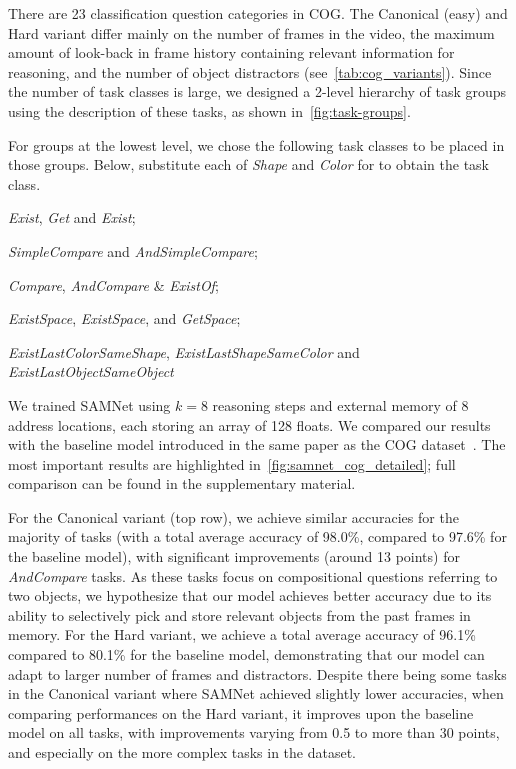 There are 23 classification question categories in COG. The Canonical (easy) and Hard variant differ mainly on the number of frames in the video, the maximum amount of look-back in frame history containing relevant information for reasoning, and the number of object distractors (see~\cref{tab:cog_variants}). Since the number of task classes is large, we designed a 2-level hierarchy of task groups using the
description of these tasks, as shown in~\cref{fig:task-groups}.

For groups at the lowest level, we chose the following task classes to be placed in those groups.
Below, substitute each of \textit{Shape} and \textit{Color} for  \uX{} to obtain the task class.
\begin{description}
	\compresslist
	\item[Basic:] \textit{Exist}\uX, \textit{Get}\uX{} and \textit{Exist};
	\item[Obj-Attr:] \emph{SimpleCompare}\uX{} and \textit{AndSimpleCompare}\uX;
	\item[Compare:] \textit{Compare}\uX,  \textit{AndCompare}\uX{} \& \textit{Exist}\uX\textit{Of};
	\item[Spatial:] \textit{ExistSpace}, \textit{Exist}\uX\textit{Space}, and \textit{Get}\uX\textit{Space};
	\item[Cognitive:] \textit{ExistLastColorSameShape}, \textit{ExistLastShapeSameColor} and \textit{ExistLastObjectSameObject}
\end{description}


We trained SAMNet using $k = 8$ reasoning steps and external memory of 8 address locations, each storing an array of 128 floats. We compared our results with the baseline model introduced in the same paper as the COG dataset~\cite{yang2018dataset}.
The most important results are highlighted in~\cref{fig:samnet_cog_detailed}; full comparison can be found in the supplementary material.

For the Canonical variant (top row), we achieve similar accuracies for the majority of tasks (with a total average accuracy of 98.0\%, compared to 97.6\% for the baseline model), with significant improvements (around 13 points) for \textit{AndCompare} tasks.
As these tasks focus on compositional questions referring to two objects, we hypothesize that our model achieves better accuracy due to its ability to selectively pick and store relevant objects from the past frames in memory.
For the Hard variant, we achieve a total average accuracy of 96.1\% compared to 80.1\% for the baseline model, demonstrating that our model can adapt to larger number of frames and distractors.
Despite there being some tasks in the Canonical variant where SAMNet achieved slightly lower accuracies, when comparing performances on the Hard variant, it improves upon the baseline model on all tasks, with improvements varying from 0.5 to more than 30 points, and especially on the more complex tasks in the dataset.


